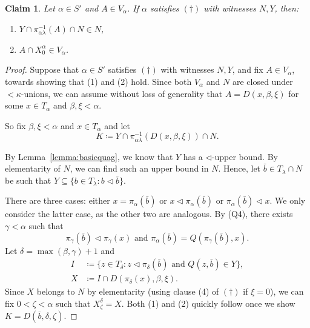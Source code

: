 \documentclass[10pt,a4paper]{amsart}
\newtheorem{claim}{Claim}
\begin{document}
\begin{claim}\label{claim:5}
Let $\alpha \in S'$ and $A \in V_\alpha$. If $\alpha$ satisfies $(\dagger)$ with witnesses $N, Y$, then:
\begin{enumerate}[label={\upshape (\arabic*)}]
\item $Y \cap \pi_{\alpha \lambda}^{-1}(A) \cap N \in N$,
\item $A \cap X^\alpha_0 \in V_\alpha$.
\end{enumerate}
\end{claim}

\begin{proof}

Suppose that $\alpha \in S'$ satisfies $(\dagger)$ with witnesses $N, Y$, and fix $A \in V_\alpha$, towards showing that (1) and (2) hold. Since both $V_\alpha$ and $N$ are closed under ${<}\kappa$-unions, we can assume without loss of generality that $A = D(x, \beta, \xi)$ for some $x \in T_\alpha$ and $\beta, \xi < \alpha$. 

So fix $\beta, \xi < \alpha$ and $x \in T_\alpha$ and  let 
\[
K \coloneqq Y \cap \pi_{\alpha \lambda}^{-1}(D(x, \beta, \xi)) \cap N.
\] 

By Lemma~\ref{lemma:basicquag}, we know that $Y$ has a $\lhd$-upper bound. By elementarity of $N$, we can find such an upper bound in $N$. Hence, let $\bar{b} \in T_{\lambda} \cap N$ be such that $Y \subseteq \{b \in T_{\lambda} : b \lhd \bar{b}\}$.

There are three cases: either $x = \pi_\alpha(\bar{b})$ or $x \lhd \pi_\alpha(\bar{b})$ or $\pi_\alpha(\bar{b}) \lhd x$. We only consider the latter case, as the other two are analogous.  By (Q4), there exists $\gamma < \alpha$ such that 
\[
\pi_\gamma(\bar{b}) \lhd \pi_\gamma(x) \text{ and } \pi_\alpha(\bar{b}) = Q(\pi_\gamma(\bar{b}),  x).
\]
Let $\delta = \max(\beta, \gamma) + 1$ and
\begin{align*}
I &\coloneqq \big\{z \in T_\delta : z \lhd \pi_\delta (\bar{b}) \text{ and } Q(z, \bar{b}) \in Y\big\},\\X &\coloneqq I \cap D(\pi_\delta(x), \beta, \xi).
\end{align*}
Since $X$ belongs to $N$ by elementarity (using clause (4) of $(\dagger)$ if $\xi = 0$), we can fix $0 < \zeta < \alpha$ such that $X^\delta_\zeta = X$. Both (1) and (2) quickly follow once we show $K = D(\bar{b}, \delta, \zeta)$.


\end{proof}
\end{document}
